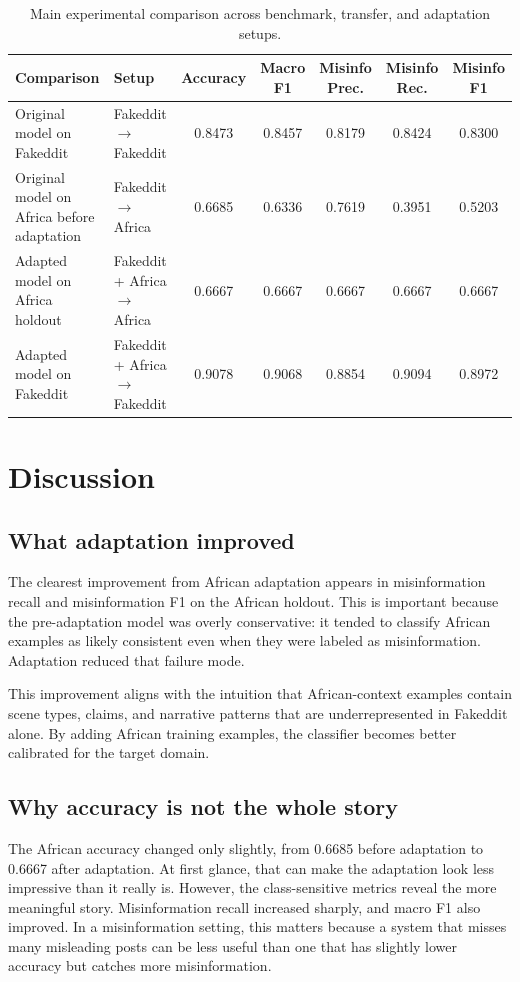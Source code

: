 \documentclass[a4paper,10.5pt,twoside]{article}
\begin{document}
\begin{table}[H]
\centering
\caption{Main experimental comparison across benchmark, transfer, and adaptation setups.}
\label{tab:main_results}
\begin{tabular}{p{4.0cm}p{3.2cm}ccccc}
\toprule
Comparison & Setup & Accuracy & Macro F1 & Misinfo Prec. & Misinfo Rec. & Misinfo F1 \\
\midrule
Original model on Fakeddit & Fakeddit $\rightarrow$ Fakeddit & 0.8473 & 0.8457 & 0.8179 & 0.8424 & 0.8300 \\
Original model on Africa before adaptation & Fakeddit $\rightarrow$ Africa & 0.6685 & 0.6336 & 0.7619 & 0.3951 & 0.5203 \\
Adapted model on Africa holdout & Fakeddit + Africa $\rightarrow$ Africa & 0.6667 & 0.6667 & 0.6667 & 0.6667 & 0.6667 \\
Adapted model on Fakeddit & Fakeddit + Africa $\rightarrow$ Fakeddit & 0.9078 & 0.9068 & 0.8854 & 0.9094 & 0.8972 \\
\bottomrule
\end{tabular}
\end{table}

\section{Discussion}
\subsection{What adaptation improved}
The clearest improvement from African adaptation appears in misinformation recall and misinformation F1 on the African holdout. This is important because the pre-adaptation model was overly conservative: it tended to classify African examples as likely consistent even when they were labeled as misinformation. Adaptation reduced that failure mode.

This improvement aligns with the intuition that African-context examples contain scene types, claims, and narrative patterns that are underrepresented in Fakeddit alone. By adding African training examples, the classifier becomes better calibrated for the target domain.

\subsection{Why accuracy is not the whole story}
The African accuracy changed only slightly, from 0.6685 before adaptation to 0.6667 after adaptation. At first glance, that can make the adaptation look less impressive than it really is. However, the class-sensitive metrics reveal the more meaningful story. Misinformation recall increased sharply, and macro F1 also improved. In a misinformation setting, this matters because a system that misses many misleading posts can be less useful than one that has slightly lower accuracy but catches more misinformation.
\end{document}
